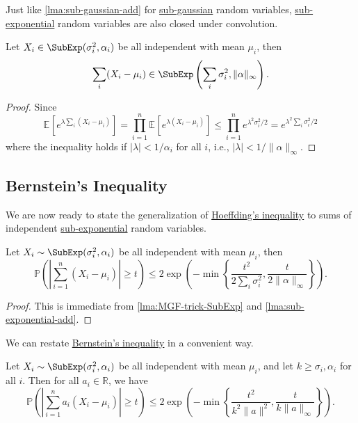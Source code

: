 Just like \autoref{lma:sub-gaussian-add} for \hyperref[def:sub-gaussian]{sub-gaussian} random variables, \hyperref[def:sub-exponential]{sub-exponential} random variables are also closed under convolution.

\begin{lemma}\label{lma:sub-exponential-add}
  Let \(X_i \in \SubExp(\sigma _i^{2} , \alpha _i) \) be all independent with mean \(\mu _i\), then
  \[
    \sum_{i} (X_i - \mu _i) \in \SubExp\left( \sum_{i} \sigma _i^2, \lVert \alpha  \rVert_\infty \right).
  \]
\end{lemma}
\begin{proof}
  Since
  \[
    \mathbb{E}_{}\left[e^{\lambda \sum_{i} (X_i - \mu _i)} \right]
    = \prod_{i=1}^{n} \mathbb{E}_{}\left[e^{\lambda (X_i - \mu _i)} \right]
    \leq \prod_{i=1}^n e^{\lambda ^2 \sigma _i^2 / 2}
    = e^{\lambda ^{2} \sum_{i} \sigma _i ^2 / 2}
  \]
  where the inequality holds if \(\vert \lambda \vert < 1 / \alpha _i\) for all \(i\), i.e., \(\vert \lambda \vert < 1 / \lVert \alpha \rVert_\infty \).
\end{proof}

\subsection{Bernstein's Inequality}
We are now ready to state the generalization of \hyperref[thm:Hoeffding-inequality]{Hoeffding's inequality} to sums of independent \hyperref[def:sub-exponential]{sub-exponential} random variables.

\begin{theorem}\label{thm:Bernstein-inequality}
  Let \(X_i \sim \SubExp(\sigma _i^{2} , \alpha _i) \) be all independent with mean \(\mu _i\), then
  \[
    \mathbb{P} \left( \left\vert \sum_{i=1}^{n} (X_i - \mu _i) \right\vert \geq t \right) \leq 2 \exp \left( - \min \left\{ \frac{t^{2} }{2 \sum_{i} \sigma _i^2}, \frac{t}{2 \lVert \alpha \rVert_\infty } \right\} \right) .
  \]
\end{theorem}
\begin{proof}
  This is immediate from \autoref{lma:MGF-trick-SubExp} and \autoref{lma:sub-exponential-add}.
\end{proof}

We can restate \hyperref[thm:Bernstein-inequality]{Bernstein's inequality} in a convenient way.

\begin{corollary}\label{col:Bernstein-inequality}
  Let \(X_i \sim \SubExp(\sigma _i^{2} , \alpha _i) \) be all independent with mean \(\mu _i\), and let \(k \geq \sigma _i, \alpha _i\) for all \(i\). Then for all \(a_i\in \mathbb{R} \), we have
  \[
    \mathbb{P} \left( \left\vert  \sum_{i=1}^{n} a_i(X_i - \mu _i) \right\vert  \geq t \right) \leq 2 \exp \left( - \min \left\{ \frac{t^{2} }{k^2 \lVert a \rVert ^2}, \frac{t}{k \lVert a \rVert _\infty } \right\} \right) .
  \]
\end{corollary}

